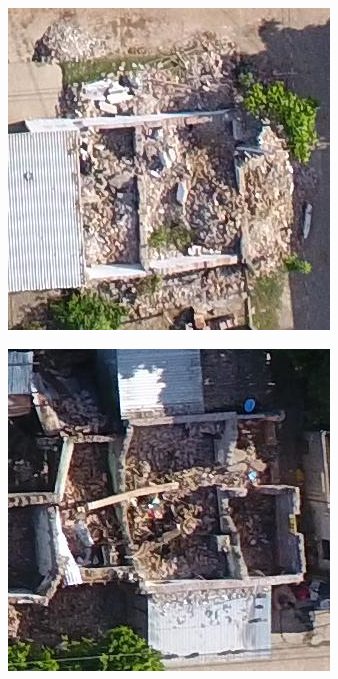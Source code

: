 \begin{figure}[!h]
\begin{subfigure}{.24\textwidth}
    \end{subfigure}
    \begin{subfigure}{.24\textwidth}
        \includegraphics[width=\textwidth]{images/damaged5.jpg}
    \end{subfigure}
    \begin{subfigure}{.24\textwidth}
        \includegraphics[width=\textwidth]{images/damaged6.jpg}

\end{subfigure}
\end{figure}
